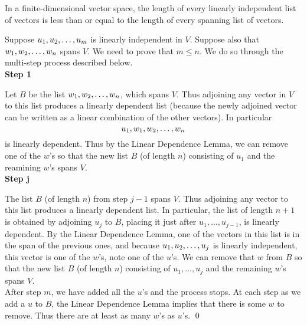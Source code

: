 \begin{theorem}
    In a finite-dimensional vector space, the length of every linearly independent list 
    of vectors is less than or equal to the length of every spanning list of vectors.

    \begin{proof*}
        Suppose $u_1, u_2, \ldots, u_{m}$ is linearly independent in $V$.
        Suppose also that $w_1, w_2, \ldots, w_{n}$ spans $V$. We need to prove that
        $m \leq n$. We do so through the multi-step process described below. \\

        \textbf{Step 1}

        Let $B$ be the list $w_1, w_2, \ldots, w_{n}$, which spans $V$. Thus adjoining any
        vector in $V$ to this list produces a linearly dependent list (because the newly
        adjoined vector can be written as a linear combination of the other vectors). In particular
        \[ u_1, w_1, w_2, \ldots, w_{n} \]
        is linearly dependent. Thus by the Linear Dependence Lemma,
        we can remove one of the $w$'s so that the new list $B$ (of length $n$)
        consisting of $u_1$ and the reamining $w$'s spans $V$. \\

        \textbf{Step j}

        The list $B$ (of length $n$) from step $j -1$ spans $V$. Thus adjoining any
        vector to this list produces a linearly dependent list. In particular, the
        list of length $n + 1$ is obtained by adjoining $u_j$ to $B$, placing it just after
        $u_1, \dots, u_{j-1}$, is linearly dependent. By the Linear Dependence Lemma, 
        one of the vectors in this list is in the span of the previous ones, and because
        $u_1, u_2, \ldots, u_{j}$ is linearly independent, this vector is one of the $w$'s, note one of
        the $u$'s. We can remove that $w$ from $B$ so that the new list $B$ (of length $n$)
        consisting of $u_1, \ldots, u_j$ and the remaining $w$'s spans $V$. \\
    
    After step $m$, we have added all the $u$'s and the process stops. At each step as
    we add a $u$ to $B$, the Linear Dependence Lemma implies that there is some $w$ to remove.
    Thus there are at least as many $w$'s as $u$'s. \qed
    \end{proof*}
\end{theorem}

